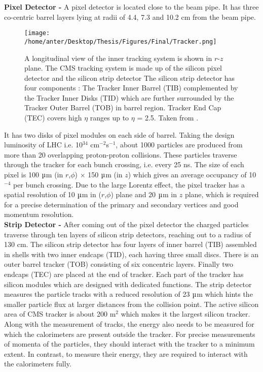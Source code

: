 {\bf Pixel Detector -} A pixel detector is located close to the beam pipe. It has three co-centric barrel layers lying at radii of 4.4, 7.3 and 10.2 cm from the beam pipe. \begin{figure}[h]
\begin{center} 
\vspace*{2mm}
\hspace*{-6mm}
\texttt{[image: /home/anter/Desktop/Thesis/Figures/Final/Tracker.png]}
\caption[A longitudinal view of the inner tracking system is shown in $r$-$z$ plane.]{A longitudinal view of the inner tracking system is shown in $r$-$z$ plane. The CMS tracking system is made up of the silicon pixel detector and the silicon strip detector  The silicon strip detector has four components : The Tracker Inner Barrel (TIB) complemented by the Tracker Inner Disks (TID) which are further surrounded by the Tracker Outer Barrel (TOB) in barrel region. Tracker End Cap (TEC) covers high $\eta$ ranges up to $\eta$ = 2.5. Taken from \cite{Chatrchyan:2008aa}.}
\label{fig:tracker}
\end{center}
\end{figure} It has two disks of pixel modules on each side of barrel. Taking the design luminosity of LHC i.e. 10$^{34}$ cm$^{-2}$s$^{-1}$, about 1000 particles are produced from more than 20 overlapping proton-proton collisions. These particles traverse through the tracker for each bunch crossing, i.e. every 25 ns. The size of each pixel is 100 $\micro$m (in $r$,$\phi$) $\times$ 150 $\micro$m (in $z$) which gives an average occupancy of 10$^{-4}$ per bunch crossing. Due to the large Lorentz effect, the pixel tracker has a spatial resolution of 10 $\micro$m in ($r$,$\phi$) plane and 20 $\micro$m in $z$ plane, which is required for a precise determination of the primary and secondary vertices and good momentum resolution. \\ \newline
{\bf Strip Detector -} After coming out of the pixel detector the charged particles traverse through ten layers of silicon strip detectors, reaching out to a radius of 130 cm. The silicon strip detector has four layers of inner barrel (TIB) assembled in shells with two inner endcaps (TID), each having three small discs. There is an outer barrel tracker (TOB) consisting of six concentric layers. Finally two endcaps (TEC) are placed at the end of tracker. Each part of the tracker has silicon modules which are designed with dedicated functions. The strip detector measures the particle tracks with a reduced resolution of 23 $\micro$m which hints the smaller particle flux at larger distances from the collision point. The active silicon area of CMS tracker is about 200 m$^{2}$ which makes it the largest silicon tracker. Along with the measurement of tracks, the energy also needs to be measured for which the calorimeters are present outside the tracker. For precise measurements of momenta of the particles, they should interact with the tracker to a minimum extent. In contrast, to measure their energy, they are required to interact with the calorimeters fully.

